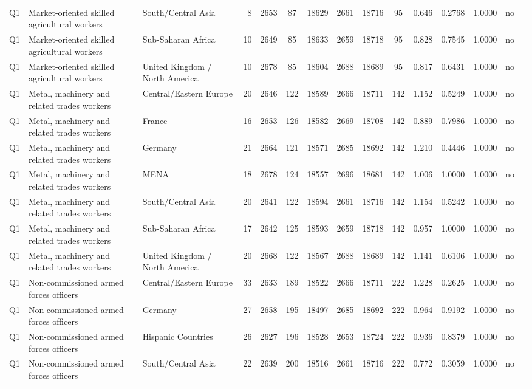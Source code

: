 \begin{longtable}{lllrcccccccccll}
Q1 & Market-oriented skilled agricultural workers & South/Central Asia & 8 & 2653 & 87 & 18629 & 2661 & 18716 & 95 & 0.646 & 0.2768 & 1.0000 & no \\
Q1 & Market-oriented skilled agricultural workers & Sub-Saharan Africa & 10 & 2649 & 85 & 18633 & 2659 & 18718 & 95 & 0.828 & 0.7545 & 1.0000 & no \\
Q1 & Market-oriented skilled agricultural workers & United Kingdom / North America & 10 & 2678 & 85 & 18604 & 2688 & 18689 & 95 & 0.817 & 0.6431 & 1.0000 & no \\
Q1 & Metal, machinery and related trades workers & Central/Eastern Europe & 20 & 2646 & 122 & 18589 & 2666 & 18711 & 142 & 1.152 & 0.5249 & 1.0000 & no \\
Q1 & Metal, machinery and related trades workers & France & 16 & 2653 & 126 & 18582 & 2669 & 18708 & 142 & 0.889 & 0.7986 & 1.0000 & no \\
Q1 & Metal, machinery and related trades workers & Germany & 21 & 2664 & 121 & 18571 & 2685 & 18692 & 142 & 1.210 & 0.4446 & 1.0000 & no \\
Q1 & Metal, machinery and related trades workers & MENA & 18 & 2678 & 124 & 18557 & 2696 & 18681 & 142 & 1.006 & 1.0000 & 1.0000 & no \\
Q1 & Metal, machinery and related trades workers & South/Central Asia & 20 & 2641 & 122 & 18594 & 2661 & 18716 & 142 & 1.154 & 0.5242 & 1.0000 & no \\
Q1 & Metal, machinery and related trades workers & Sub-Saharan Africa & 17 & 2642 & 125 & 18593 & 2659 & 18718 & 142 & 0.957 & 1.0000 & 1.0000 & no \\
Q1 & Metal, machinery and related trades workers & United Kingdom / North America & 20 & 2668 & 122 & 18567 & 2688 & 18689 & 142 & 1.141 & 0.6106 & 1.0000 & no \\
Q1 & Non-commissioned armed forces officers & Central/Eastern Europe & 33 & 2633 & 189 & 18522 & 2666 & 18711 & 222 & 1.228 & 0.2625 & 1.0000 & no \\
Q1 & Non-commissioned armed forces officers & Germany & 27 & 2658 & 195 & 18497 & 2685 & 18692 & 222 & 0.964 & 0.9192 & 1.0000 & no \\
Q1 & Non-commissioned armed forces officers & Hispanic Countries & 26 & 2627 & 196 & 18528 & 2653 & 18724 & 222 & 0.936 & 0.8379 & 1.0000 & no \\
Q1 & Non-commissioned armed forces officers & South/Central Asia & 22 & 2639 & 200 & 18516 & 2661 & 18716 & 222 & 0.772 & 0.3059 & 1.0000 & no \\

\end{longtable}
